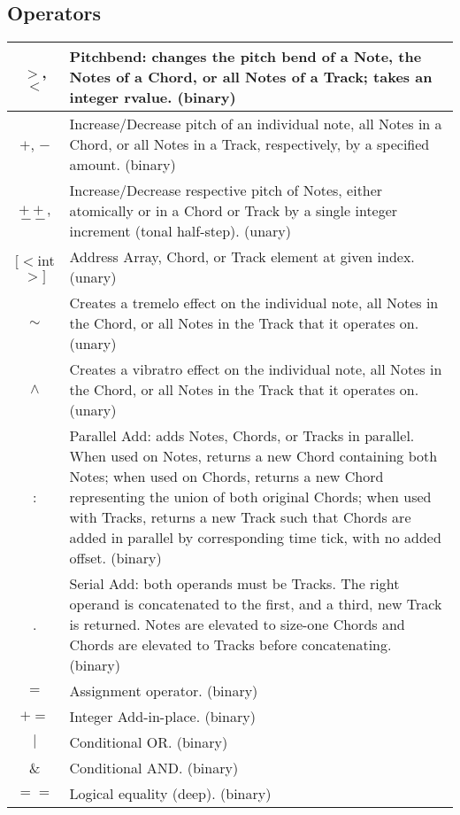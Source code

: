 \documentclass[letterpaper]{article}
\begin{document}
\begin{samepage}
\subsection{Operators}
\begin{table}[H]
\centering
\begin{tabularx}{.75\textwidth}{|c|X|}
\hline
$>$, $<$ & Pitchbend: changes the pitch bend of a Note, the Notes of a Chord, or all Notes of a Track; takes an integer rvalue. (binary) \\
\hline
$+$, $-$ & Increase/Decrease pitch of an individual note, all Notes in a Chord, or all Notes in a Track, respectively, by a specified amount. (binary) \\
\hline
$++$, $--$ & Increase/Decrease respective pitch of Notes, either atomically or in a Chord or Track by a single integer increment (tonal half-step). (unary) \\
\hline
$[<$int$>]$ & Address Array, Chord, or Track element at given index. (unary) \\
\hline
$\sim$ & Creates a tremelo effect on the individual note, all Notes in the Chord, or all Notes in the Track that it operates on. (unary) \\
\hline
$\wedge$ & Creates a vibratro effect on the individual note, all Notes in the Chord, or all Notes in the Track that it operates on. (unary) \\
\hline
: & Parallel Add: adds Notes, Chords, or Tracks in parallel. When used on Notes, returns a new Chord containing both Notes; when used on Chords, returns a new Chord representing the union of both original Chords; when used with Tracks, returns a new Track such that Chords are added in parallel by corresponding time tick, with no added offset. (binary) \\
\hline
. & Serial Add: both operands must be Tracks. The right operand is concatenated to the first, and a third, new  Track is returned. Notes are elevated to size-one Chords and Chords are elevated to Tracks before concatenating. (binary) \\
\hline
$=$ & Assignment operator. (binary) \\
\hline
$+=$ & Integer Add-in-place. (binary)\\
\hline
$|$ & Conditional OR. (binary)\\
\hline
\& & Conditional AND. (binary)\\
\hline
$==$ & Logical equality (deep). (binary) \\
\hline
\end{tabularx}
\end{table}
\end{samepage}
\end{document}
